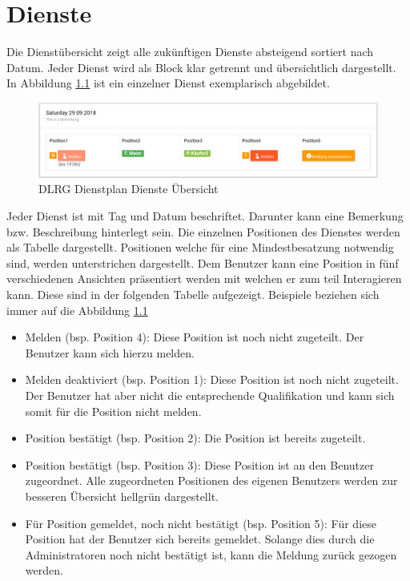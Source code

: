 \chapter{Dienste}
\label{cha:dienste}
Die Dienstübersicht zeigt alle zukünftigen Dienste absteigend sortiert nach Datum. Jeder Dienst wird als Block klar getrennt und übersichtlich dargestellt. In Abbildung \ref{fig:view_service} \textit{} ist ein einzelner Dienst exemplarisch abgebildet.

\begin{figure}[h]
 \begin{addmargin}{-0.2\linewidth}
   \centering 
   \includegraphics[width=20cm]{Bilder/view_service.png}
 \end{addmargin} 
 \caption[Dienste Übersicht]{DLRG Dienstplan Dienste Übersicht}
 \label{fig:view_service}
\end{figure}

\noindent Jeder Dienst ist mit Tag und Datum beschriftet. Darunter kann eine Bemerkung bzw. Beschreibung hinterlegt sein. Die einzelnen Positionen des Dienstes werden als Tabelle dargestellt. Positionen welche für eine Mindestbesatzung notwendig sind, werden unterstrichen dargestellt.
\noindent Dem Benutzer kann eine Position in fünf verschiedenen Ansichten präsentiert werden mit welchen er zum teil Interagieren kann.
Diese sind in der folgenden Tabelle aufgezeigt. Beispiele beziehen sich immer auf die Abbildung \ref{fig:view_service} \textit{}

\begin{itemize}
\item Melden (bsp. Position 4): Diese Position ist noch nicht zugeteilt. Der Benutzer kann sich hierzu melden.
\item Melden deaktiviert (bsp. Position 1): Diese Position ist noch nicht zugeteilt. Der Benutzer hat aber nicht die entsprechende Qualifikation und kann sich somit für die Position nicht melden.
\item Position bestätigt (bsp. Position 2): Die Position ist bereits zugeteilt.
\item Position bestätigt (bsp. Position 3): Diese Position ist an den Benutzer zugeordnet. Alle zugeordneten Positionen des eigenen Benutzers werden zur besseren Übersicht hellgrün dargestellt.
\item Für Position gemeldet, noch nicht bestätigt (bsp. Position 5): Für diese Position hat der Benutzer sich bereits gemeldet. Solange dies durch die Administratoren noch nicht bestätigt ist, kann die Meldung zurück gezogen werden.
\end{itemize}

